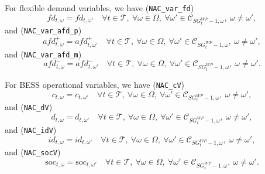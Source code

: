 \documentclass{article}
\newcommand{\soc}{\text{soc}}
\begin{document}
For flexible demand variables, we have (\verb|NAC_var_fd|)
\begin{equation} \label{EQ:NAC_var_fd}
	fd_{t, \omega} = fd_{t, \omega'} \quad \forall t \in \mathcal{T}, \ \forall \omega \in \Omega, \ \forall \omega' \in \mathcal{C}_{SG^{WP}_t - 1, \omega}, \ \omega \neq \omega',
\end{equation}
and (\verb|NAC_var_afd_p|)
\begin{equation} \label{EQ:NAC_var_afd_p}
	afd^+_{t, \omega} = afd^+_{t, \omega'} \quad \forall t \in \mathcal{T}, \ \forall \omega \in \Omega, \ \forall \omega' \in \mathcal{C}_{SG^{WP}_t - 1, \omega}, \ \omega \neq \omega',
\end{equation}
and (\verb|NAC_var_afd_m|)
\begin{equation} \label{EQ:NAC_var_afd_m}
	afd^-_{t, \omega} = afd^-_{t, \omega'} \quad \forall t \in \mathcal{T}, \ \forall \omega \in \Omega, \ \forall \omega' \in \mathcal{C}_{SG^{WP}_t - 1, \omega}, \ \omega \neq \omega'.
\end{equation}


For BESS operational variables, we have (\verb|NAC_cV|)
\begin{equation} \label{EQ:NAC_cV}
	c_{t, \omega} = c_{t, \omega'} \quad \forall t \in \mathcal{T}, \ \forall \omega \in \Omega, \ \forall \omega' \in \mathcal{C}_{SG^{WP}_t - 1, \omega}, \ \omega \neq \omega',
\end{equation}
and (\verb|NAC_dV|)
\begin{equation} \label{EQ:NAC_dV}
	d_{t, \omega} = d_{t, \omega'} \quad \forall t \in \mathcal{T}, \ \forall \omega \in \Omega, \ \forall \omega' \in \mathcal{C}_{SG^{WP}_t - 1, \omega}, \ \omega \neq \omega',
\end{equation}
and (\verb|NAC_idV|)
\begin{equation} \label{EQ:NAC_idV}
	id_{t, \omega} = id_{t, \omega'} \quad \forall t \in \mathcal{T}, \ \forall \omega \in \Omega, \ \forall \omega' \in \mathcal{C}_{SG^{WP}_t - 1, \omega}, \ \omega \neq \omega',
\end{equation}
and (\verb|NAC_socV|)
\begin{equation} \label{EQ:NAC_socV}
	\soc_{t, \omega} = \soc_{t, \omega'} \quad \forall t \in \mathcal{T}, \ \forall \omega \in \Omega, \ \forall \omega' \in \mathcal{C}_{SG^{WP}_t - 1, \omega}, \ \omega \neq \omega'.
\end{equation}
\end{document}
